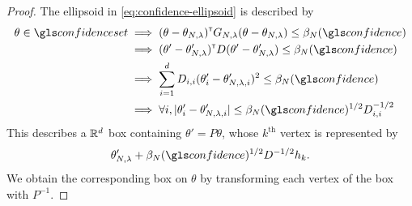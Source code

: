 \begin{subappendices}
	\begin{proof}
		The ellipsoid in \eqref{eq:confidence-ellipsoid} is described by
		\begin{align*}
		\theta\in\confidenceset &\implies
		(\theta-\theta_{N,\lambda})^\transp G_{N,\lambda}(\theta-\theta_{N,\lambda}) \leq \beta_{N}(\confidence)\\
		&\implies (\theta'-\theta'_{N,\lambda})^\transp D (\theta'-\theta'_{N,\lambda}) \leq \beta_{N}(\confidence)\\
		&\implies \sum_{i=1}^d D_{i,i}(\theta'_i-\theta'_{N,\lambda,i})^2\leq \beta_{N}(\confidence)\\
		&\implies\forall i, |\theta'_i-\theta'_{N,\lambda,i}|\leq \beta_{N}(\confidence)^{1/2}D_{i,i}^{-1/2}
		\end{align*}
		This describes a $\mathbb{R}^d$ box containing $\theta' = P\theta$, whose $k^\text{th}$ vertex is represented by $$\theta_{N,\lambda}' + \beta_{N}(\confidence)^{1/2}D^{-1/2} h_k.$$ We obtain the corresponding box on $\theta$ by transforming each vertex of the box with $P^{-1}$.
	\end{proof}


\end{subappendices}
